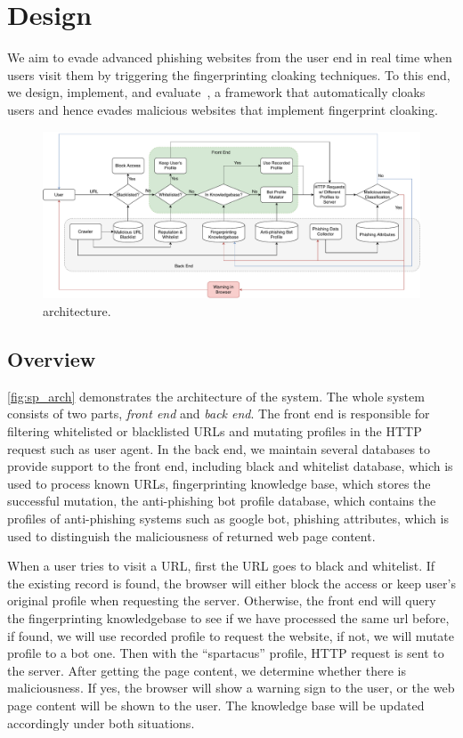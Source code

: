 \section{Design}


We aim to evade advanced phishing websites from the user end in real time when users visit them by triggering the fingerprinting cloaking techniques.
To this end, we design, implement, and evaluate~\spartacus, a framework that automatically cloaks users and hence evades malicious websites that implement fingerprint cloaking.

\begin{figure}
\centering
\includegraphics[width=\linewidth]{figs/arch.pdf}
\caption{\spartacus architecture.}
\label{fig:sp_arch}
\end{figure}

\subsection{Overview}
\autoref{fig:sp_arch} demonstrates the architecture of the \spartacus system.
The whole system consists of two parts, \emph{front end} and \emph{back end}. 
The front end is responsible for filtering whitelisted or blacklisted URLs and mutating profiles in the HTTP request such as user agent. 
In the back end, we maintain several databases to provide support to the front end, including black and whitelist database, which is used to process known URLs, fingerprinting knowledge base, which stores the successful mutation, the anti-phishing bot profile database, which contains the profiles of anti-phishing systems such as google bot, phishing attributes, which is used to distinguish the maliciousness of returned web page content. 

When a user tries to visit a URL, first the URL goes to black and whitelist. 
If the existing record is found, the browser will either block the access or keep user's original profile when requesting the server. 
Otherwise, the front end will query the fingerprinting knowledgebase to see if we have processed the same url before, if found, we will use recorded profile to request the website, if not, we will mutate profile to a bot one. Then with the “spartacus” profile, HTTP request is sent to the server. After getting the page content, we determine whether there is maliciousness. If yes, the browser will show a warning sign to the user, or the web page content will be shown to the user. The knowledge base will be updated accordingly under both situations. 

